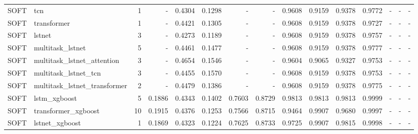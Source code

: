 \begin{tabular}{llrrrrrrrrrrlll}
SOFT & tcn & 1 & - & 0.4304 & 0.1298 & - & - & 0.9608 & 0.9159 & 0.9378 & 0.9772 & - & - & - \\
SOFT & transformer & 1 & - & 0.4421 & 0.1305 & - & - & 0.9608 & 0.9159 & 0.9378 & 0.9727 & - & - & - \\
SOFT & lstnet & 3 & - & 0.4273 & 0.1189 & - & - & 0.9608 & 0.9159 & 0.9378 & 0.9757 & - & - & - \\
SOFT & multitask_lstnet & 5 & - & 0.4461 & 0.1477 & - & - & 0.9608 & 0.9159 & 0.9378 & 0.9777 & - & - & - \\
SOFT & multitask_lstnet_attention & 3 & - & 0.4654 & 0.1546 & - & - & 0.9604 & 0.9065 & 0.9327 & 0.9753 & - & - & - \\
SOFT & multitask_lstnet_tcn & 3 & - & 0.4455 & 0.1570 & - & - & 0.9608 & 0.9159 & 0.9378 & 0.9753 & - & - & - \\
SOFT & multitask_lstnet_transformer & 2 & - & 0.4479 & 0.1386 & - & - & 0.9608 & 0.9159 & 0.9378 & 0.9775 & - & - & - \\
SOFT & lstm_xgboost & 5 & 0.1886 & 0.4343 & 0.1402 & 0.7603 & 0.8729 & 0.9813 & 0.9813 & 0.9813 & 0.9999 & - & - & - \\
SOFT & transformer_xgboost & 10 & 0.1915 & 0.4376 & 0.1253 & 0.7566 & 0.8715 & 0.9464 & 0.9907 & 0.9680 & 0.9997 & - & - & - \\
SOFT & lstnet_xgboost & 1 & 0.1869 & 0.4323 & 0.1224 & 0.7625 & 0.8733 & 0.9725 & 0.9907 & 0.9815 & 0.9998 & - & - & - \\
\bottomrule
\end{tabular}
